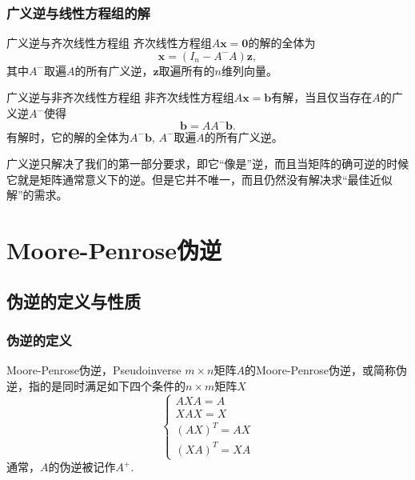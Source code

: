 \begin{frame}
\frametitle{广义逆与线性方程组的解}

\begin{block}{广义逆与齐次线性方程组}
齐次线性方程组$A\mathbf{x} = \mathbf{0}$的解的全体为
$$\mathbf{x} = (I_n - A^-A)\mathbf{z},$$
其中$A^-$取遍$A$的所有广义逆，$\mathbf{z}$取遍所有的$n$维列向量。
\end{block}

\pause

\begin{block}{广义逆与非齐次线性方程组}
非齐次线性方程组$A\mathbf{x} = \mathbf{b}$有解，当且仅当存在$A$的广义逆$A^-$使得
$$\mathbf{b} = A A^- \mathbf{b}.$$
有解时，它的解的全体为$A^-\mathbf{b}$, $A^-$取遍$A$的所有广义逆。
\end{block}

\end{frame}


\begin{frame}

{
\large
广义逆只解决了我们的第一部分要求，即它``像是''逆，而且当矩阵的确可逆的时候它就是矩阵通常意义下的逆。但是它并不唯一，而且仍然没有解决求``最佳近似解''的需求。
}

\end{frame}


\section{Moore-Penrose伪逆}


\subsection{伪逆的定义与性质}


\begin{frame}
\frametitle{伪逆的定义}

\begin{block}{Moore-Penrose伪逆，Pseudoinverse}
$m\times n$矩阵$A$的Moore-Penrose伪逆，或简称伪逆，指的是同时满足如下四个条件的$n\times m$矩阵$X$
\[
\begin{cases}
AXA = A \\
XAX = X \\
(AX)^T = AX \\
(XA)^T = XA
\end{cases}
\]
通常，$A$的伪逆被记作$A^+$.
\end{block}

\end{frame}


